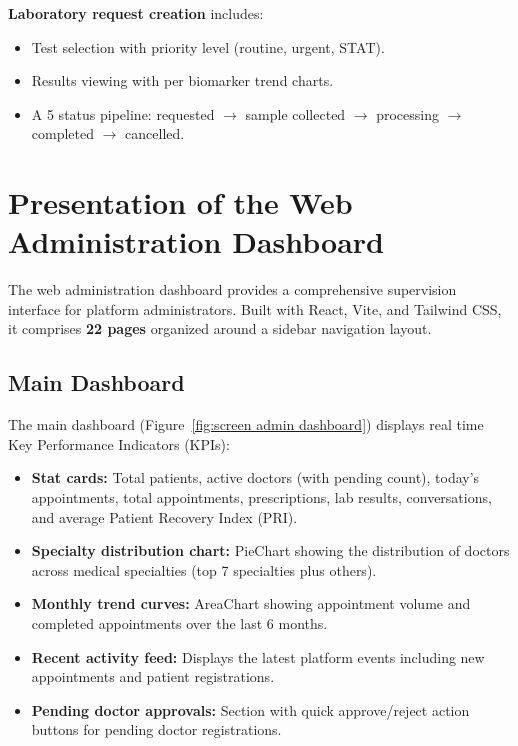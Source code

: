 \documentclass[12pt,a4paper,oneside]{report}
\begin{document}
\textbf{Laboratory request creation} includes:

\begin{itemize}
    \item Test selection with priority level (routine, urgent, STAT).
    \item Results viewing with per biomarker trend charts.
    \item A 5 status pipeline: requested $\rightarrow$ sample collected $\rightarrow$ processing $\rightarrow$ completed $\rightarrow$ cancelled.
\end{itemize}

\section{Presentation of the Web Administration Dashboard}

The web administration dashboard provides a comprehensive supervision interface for platform administrators. Built with React, Vite, and Tailwind CSS, it comprises \textbf{22 pages} organized around a sidebar navigation layout.

\subsection{Main Dashboard}

The main dashboard (Figure~\ref{fig:screen admin dashboard}) displays real time Key Performance Indicators (KPIs):

\begin{itemize}
    \item \textbf{Stat cards:} Total patients, active doctors (with pending count), today's appointments, total appointments, prescriptions, lab results, conversations, and average Patient Recovery Index (PRI).
    \item \textbf{Specialty distribution chart:} PieChart showing the distribution of doctors across medical specialties (top 7 specialties plus others).
    \item \textbf{Monthly trend curves:} AreaChart showing appointment volume and completed appointments over the last 6 months.
    \item \textbf{Recent activity feed:} Displays the latest platform events including new appointments and patient registrations.
    \item \textbf{Pending doctor approvals:} Section with quick approve/reject action buttons for pending doctor registrations.
\end{itemize}
\end{document}
